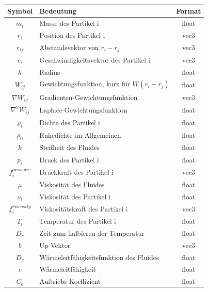 \documentclass[intern,palatino]{cgBA}
\begin{document}
\begin{figure}
	\centering
		\begin{tabular}{ | c | p{8cm} | c |}
			\hline
			Symbol & Bedeutung & Format  \\ \hline
			$m_i $ 				&  Masse des Partikel i								&	float	\\ \hline
			$r_i $		 		&  Position des Partikel i							&	vec3	\\ \hline
			$r_{ij}$ 			&  Abstandsvektor von $r_i - r_j$					&	vec3	\\ \hline
			$v_i$	 			&  Geschwindigkeitsvektor des Partikel i			&	vec3	\\ \hline
			$h $ 				&  Radius											&	float	\\ \hline
			$W_{ij} $ 			&  Gewichtungsfunktion, kurz für $W (r_i - r_j)$	&	float	\\ \hline
			$\nabla W_{ij} $ 	&  Gradienten-Gewichtungsfunktion					&	vec3	\\ \hline
			$\nabla^2 W_{ij} $ 	&  Laplace-Gewichtungsfunktion						&	float	\\ \hline
			$\rho_i $ 			&  Dichte des Partikel i		 					&	float	\\ \hline
			$\rho_0 $ 			&  Ruhedichte im Allgemeinen						&	float	\\ \hline
			$k $ 				&  Steifheit des Fluides							&	float	\\ \hline
			$p_i $ 				&  Druck des Partikel i								&	float	\\ \hline
			$f^{pressure}_i $	&  Druckkraft des Partikel i						&	vec3	\\ \hline
			$\mu $ 				&  Viskosität des Fluides							&	float	\\ \hline
			$\nu_i $ 			&  Viskosität des Partikel i						&	float	\\ \hline
			$f^{viscosity}_i $ 	&  Viskositätskraft des Partikel i					&	vec3	\\ \hline
			$T_i $ 				&  Temperatur des Partikel i						&	float	\\ \hline
			$D_r $ 				&  Zeit zum halbieren der Temperatur				&	float	\\ \hline
			$b $ 				&  Up-Vektor										&	vec3	\\ \hline
			$D_c $ 				&  Wärmeleitfähigkeitsfunktion des Fluides			&	float	\\ \hline
			$c $ 				&  Wärmeleitfähigkeit								&	float	\\ \hline
			$C_b $ 				&  Auftriebs-Koeffizient							&	float	\\ \hline

\end{tabular}
\end{figure}
\end{document}
